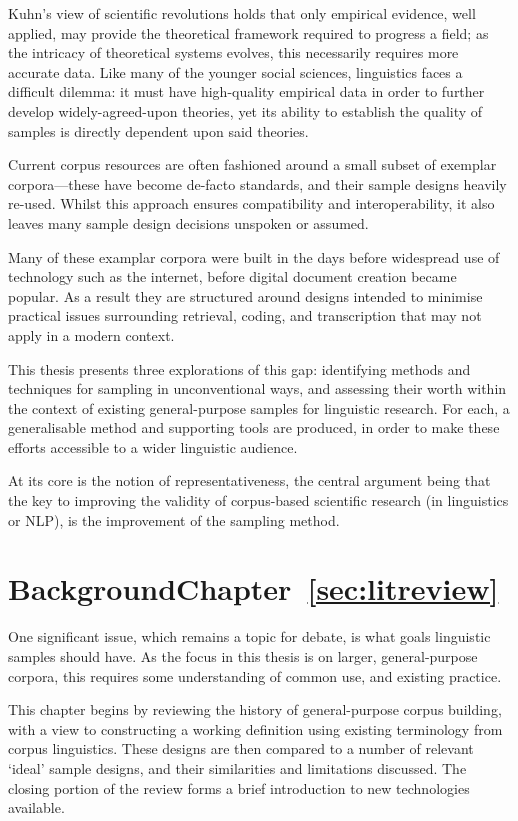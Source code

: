 

Kuhn's view of scientific revolutions\cite{kuhn1970structure}
holds that only empirical evidence, well applied, may provide the theoretical framework required to progress a field; as the intricacy of theoretical systems evolves, this necessarily requires more accurate data.  Like many of the younger social sciences, linguistics faces a difficult dilemma: it must have high-quality empirical data in order to further develop widely-agreed-upon theories, yet its ability to establish the quality of samples is directly dependent upon said theories.

Current corpus resources are often fashioned around a small subset of exemplar corpora---these have become de-facto standards, and their sample designs heavily re-used.
Whilst this approach ensures compatibility and interoperability, it also leaves many sample design decisions unspoken or assumed.

Many of these examplar corpora were built in the days before widespread use of technology such as the internet, before digital document creation became popular.  As a result they are structured around designs intended to minimise practical issues surrounding retrieval, coding, and transcription that may not apply in a modern context.

This thesis presents three explorations of this gap: identifying methods and techniques for sampling in unconventional ways, and assessing their worth within the context of existing general-purpose samples for linguistic research.  For each, a generalisable method and supporting tools are produced, in order to make these efforts accessible to a wider linguistic audience.

At its core is the notion of representativeness, the central argument being that the key to improving the validity of corpus-based scientific research (in linguistics or NLP), is the improvement of the sampling method.

\section*{Background\hfill{}Chapter~\ref{sec:litreview}}
One significant issue, which remains a topic for debate, is what goals linguistic samples should have.  As the focus in this thesis is on larger, general-purpose corpora, this requires some understanding of common use, and existing practice.

This chapter begins by reviewing the history of general-purpose corpus building, with a view to constructing a working definition using existing terminology from corpus linguistics.  These designs are then compared to a number of relevant `ideal' sample designs, and their similarities and limitations discussed.  The closing portion of the review forms a brief introduction to new technologies available.


